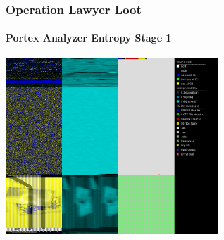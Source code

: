 \documentclass[aspectratio=169]{beamer}
\begin{document}
{
\begin{frame}
  \frametitle{Operation Lawyer Loot}
  \framesubtitle{Portex Analyzer Entropy Stage 1}
  \begin{center}
    \includegraphics[width=8cm]{kpot-portex-analyzer-stage-1}
  \end{center}
\end{frame}
}
\end{document}
